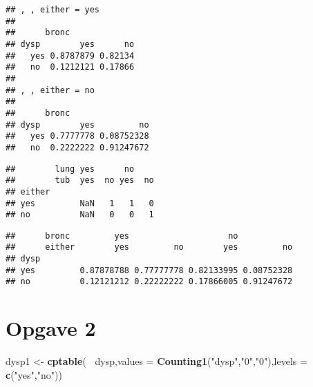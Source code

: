 \documentclass[
]{article}
\newenvironment{Shaded}{\begin{snugshade}}{\end{snugshade}}
\newcommand{\DataTypeTok}[1]{\textcolor[rgb]{0.13,0.29,0.53}{#1}}
\newcommand{\DecValTok}[1]{\textcolor[rgb]{0.00,0.00,0.81}{#1}}
\newcommand{\KeywordTok}[1]{\textcolor[rgb]{0.13,0.29,0.53}{\textbf{#1}}}
\newcommand{\NormalTok}[1]{#1}
\newcommand{\OperatorTok}[1]{\textcolor[rgb]{0.81,0.36,0.00}{\textbf{#1}}}
\newcommand{\StringTok}[1]{\textcolor[rgb]{0.31,0.60,0.02}{#1}}
\begin{document}
\begin{verbatim}
## , , either = yes
## 
##      bronc
## dysp        yes      no
##   yes 0.8787879 0.82134
##   no  0.1212121 0.17866
## 
## , , either = no
## 
##      bronc
## dysp        yes         no
##   yes 0.7777778 0.08752328
##   no  0.2222222 0.91247672
\end{verbatim}

\begin{Shaded}
\end{Shaded}

\begin{verbatim}
##        lung yes      no    
##        tub  yes  no yes  no
## either                     
## yes         NaN   1   1   0
## no          NaN   0   0   1
\end{verbatim}

\begin{Shaded}
\end{Shaded}

\begin{verbatim}
##      bronc         yes                    no           
##      either        yes         no        yes         no
## dysp                                                   
## yes         0.87878788 0.77777778 0.82133995 0.08752328
## no          0.12121212 0.22222222 0.17866005 0.91247672
\end{verbatim}

\hypertarget{opgave-2}{%
\section{Opgave 2}\label{opgave-2}}

\begin{Shaded}
\begin{Highlighting}[]
\NormalTok{dysp1 <-}\StringTok{ }\KeywordTok{cptable}\NormalTok{(}\OperatorTok{~}\StringTok{ }\NormalTok{dysp,}\DataTypeTok{values =} \KeywordTok{Counting1}\NormalTok{(}\StringTok{"dysp"}\NormalTok{,}\StringTok{"0"}\NormalTok{,}\StringTok{"0"}\NormalTok{),}\DataTypeTok{levels =} \KeywordTok{c}\NormalTok{(}\StringTok{"yes"}\NormalTok{,}\StringTok{"no"}\NormalTok{))}
\end{Highlighting}
\end{Shaded}
\end{document}
